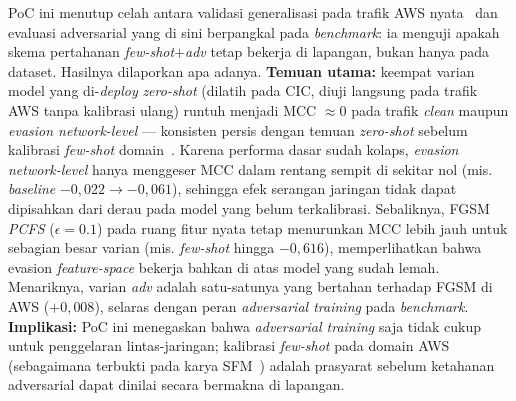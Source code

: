 \documentclass[11pt,a4paper]{article}
\begin{document}
\noindent PoC ini menutup celah antara validasi generalisasi pada trafik AWS
nyata~\cite{martono2024sfm} dan evaluasi adversarial yang di sini berpangkal pada
\emph{benchmark}: ia menguji apakah skema pertahanan \emph{few-shot$+$adv} tetap
bekerja di lapangan, bukan hanya pada dataset. Hasilnya dilaporkan apa adanya. \textbf{Temuan utama:} keempat varian
model yang di-\emph{deploy} \emph{zero-shot} (dilatih pada CIC, diuji langsung pada
trafik AWS tanpa kalibrasi ulang) runtuh menjadi MCC $\approx 0$ pada trafik
\emph{clean} maupun \emph{evasion network-level} --- konsisten persis dengan temuan
\emph{zero-shot} sebelum kalibrasi \emph{few-shot} domain~\cite{martono2024sfm}. Karena performa
dasar sudah kolaps, \emph{evasion network-level} hanya menggeser MCC dalam rentang
sempit di sekitar nol (mis. \emph{baseline} $-0{,}022 \rightarrow -0{,}061$),
sehingga efek serangan jaringan tidak dapat dipisahkan dari derau pada model yang
belum terkalibrasi. Sebaliknya, FGSM \emph{PCFS} ($\epsilon=0.1$)
pada ruang fitur nyata tetap menurunkan MCC lebih jauh untuk sebagian besar varian
(mis. \emph{few-shot} hingga $-0{,}616$), memperlihatkan bahwa evasion
\emph{feature-space} bekerja bahkan di atas model yang sudah lemah. Menariknya,
varian \emph{adv} adalah satu-satunya yang bertahan terhadap FGSM di AWS
($+0{,}008$), selaras dengan peran \emph{adversarial training} pada \emph{benchmark}.
\textbf{Implikasi:} PoC ini menegaskan bahwa \emph{adversarial training} saja tidak
cukup untuk penggelaran lintas-jaringan; kalibrasi \emph{few-shot} pada domain AWS
(sebagaimana terbukti pada karya SFM~\cite{martono2024sfm}) adalah prasyarat sebelum
ketahanan adversarial dapat dinilai secara bermakna di lapangan.
\end{document}
